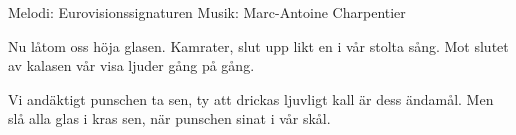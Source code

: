 \begin{song}

\begin{songmeta}
Melodi: Eurovisionssignaturen
Musik: Marc-Antoine Charpentier
\end{songmeta}

\begin{songtext}
Nu låtom oss höja glasen.
Kamrater, slut upp likt en i vår stolta sång.
Mot slutet av kalasen
vår visa ljuder gång på gång.

Vi andäktigt punschen ta sen,
ty att drickas ljuvligt kall är dess ändamål.
Men slå alla glas i kras sen,
när punschen sinat i vår skål.
\end{songtext}
\end{song}
